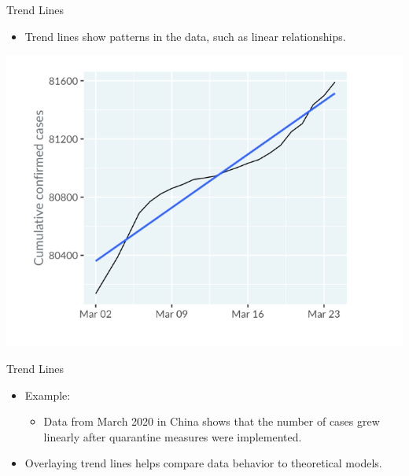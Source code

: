 \documentclass[
  ignorenonframetext,
]{beamer}
\providecommand{\tightlist}{%
  \setlength{\itemsep}{0pt}\setlength{\parskip}{0pt}}
\begin{document}
\begin{frame}{Trend Lines}
\label{trend-lines}
\begin{itemize}
\tightlist
\item
  Trend lines show patterns in the data, such as linear relationships.
\end{itemize}

\includegraphics{../images/im43.png}
\end{frame}

\begin{frame}{Trend Lines}
\label{trend-lines-1}
\begin{itemize}
\item
  Example:

  \begin{itemize}
  \tightlist
  \item
    Data from March 2020 in China shows that the number of cases grew
    linearly after quarantine measures were implemented.
  \end{itemize}
\item
  Overlaying trend lines helps compare data behavior to theoretical
  models.
\end{itemize}
\end{frame}
\end{document}
